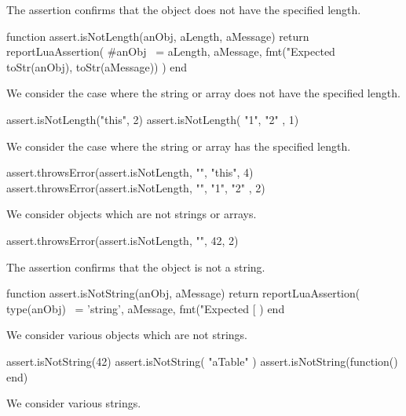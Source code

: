 The  assertion confirms that the object does not 
have the specified length. 

\startLuaCode
function assert.isNotLength(anObj, aLength, aMessage)
  return reportLuaAssertion(
    #anObj ~= aLength,
    aMessage,
    fmt("Expected %
      toStr(anObj), toStr(aMessage))
  )
end
\stopLuaCode


We consider the case where the string or array does not have the specified 
length.

\startLuaTest
  assert.isNotLength("this", 2)
  assert.isNotLength({ "1", "2" }, 1)
\stopLuaTest
\stopTestCase


We consider the case where the string or array has the specified length. 

\startLuaTest
  assert.throwsError(assert.isNotLength, "", "this", 4)
  assert.throwsError(assert.isNotLength, "", { "1", "2" }, 2)
\stopLuaTest
\stopTestCase


We consider objects which are not strings or arrays.

\startLuaTest
  assert.throwsError(assert.isNotLength, "", 42, 2)
\stopLuaTest
\stopTestCase

\stopTestSuite


The  assertion confirms that the object is not a 
string. 

\startLuaCode
function assert.isNotString(anObj, aMessage)
  return reportLuaAssertion(
    type(anObj) ~= 'string',
    aMessage,
    fmt("Expected [%
  )
end
\stopLuaCode


We consider various objects which are not strings.

\startLuaTest
  assert.isNotString(42)
  assert.isNotString({ "aTable" })
  assert.isNotString(function() end)
\stopLuaTest
\stopTestCase


We consider various strings.

